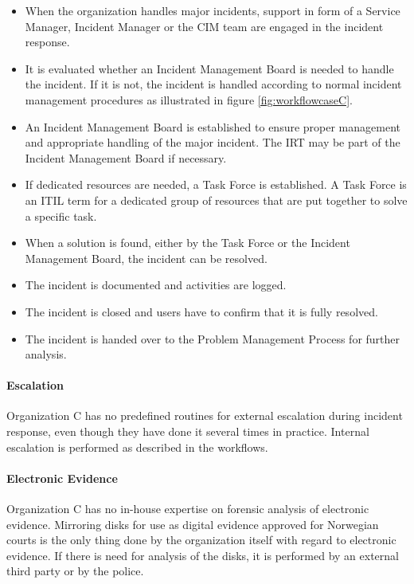 \begin{itemize}
\item When the organization handles major incidents, support in form of a Service Manager, Incident Manager or the \ac{CIM} team are engaged in the incident response.
\item It is evaluated whether an Incident Management Board is needed to handle the incident. If it is not, the incident is handled according to normal incident management procedures as illustrated in figure \ref{fig:workflowcaseC}.
\item An Incident Management Board is established to ensure proper management and appropriate handling of the major incident. The \ac{IRT} may be part of the Incident Management Board if necessary.
\item If dedicated resources are needed, a Task Force is established. A Task Force is an ITIL term for a dedicated group of resources that are put together to solve a specific task.
\item When a solution is found, either by the Task Force or the Incident Management Board, the incident can be resolved.
\item The incident is documented and activities are logged.
\item The incident is closed and users have to confirm that it is fully resolved.
\item The incident is handed over to the Problem Management Process for further analysis.  
\end{itemize}


\paragraph{Escalation}
Organization C has no predefined routines for external escalation during incident response, even though they have done it several times in practice. Internal escalation is performed as described in the workflows.

\paragraph{Electronic Evidence}
Organization C has no in-house expertise on forensic analysis of electronic evidence. Mirroring disks for use as digital evidence approved for Norwegian courts is the only thing done by the organization itself with regard to electronic evidence. If there is need for analysis of the disks, it is performed by an external third party or by the police.

